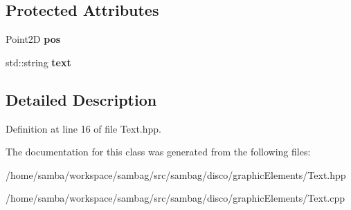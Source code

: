 \subsection*{Protected Attributes}
\begin{DoxyCompactItemize}
\item 
\hypertarget{classsambag_1_1disco_1_1graphic_elements_1_1_text_a23d407397f843ee3c00cd4c9126ce569}{
Point2D {\bfseries pos}}
\label{classsambag_1_1disco_1_1graphic_elements_1_1_text_a23d407397f843ee3c00cd4c9126ce569}

\item 
\hypertarget{classsambag_1_1disco_1_1graphic_elements_1_1_text_a0b0d752d402b082b06eb6e8b52b683af}{
std::string {\bfseries text}}
\label{classsambag_1_1disco_1_1graphic_elements_1_1_text_a0b0d752d402b082b06eb6e8b52b683af}

\end{DoxyCompactItemize}


\subsection{Detailed Description}


Definition at line 16 of file Text.hpp.



The documentation for this class was generated from the following files:\begin{DoxyCompactItemize}
\item 
/home/samba/workspace/sambag/src/sambag/disco/graphicElements/Text.hpp\item 
/home/samba/workspace/sambag/src/sambag/disco/graphicElements/Text.cpp\end{DoxyCompactItemize}
